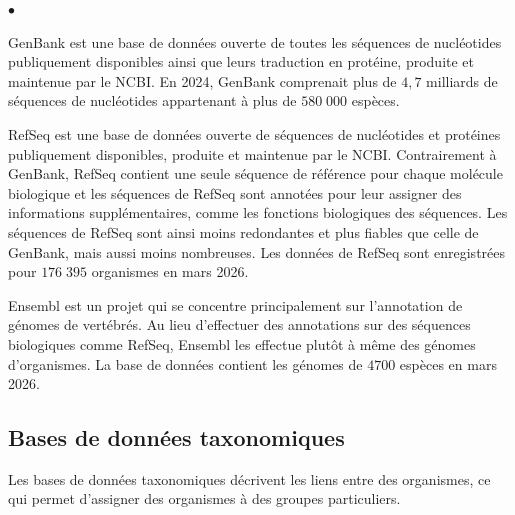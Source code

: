 \begin{list}{$\bullet$}{}
    \item GenBank \cite{genbank} est une base de données ouverte de toutes les séquences de
        nucléotides publiquement disponibles ainsi que leurs traduction en protéine, produite et
        maintenue par le NCBI. En 2024, GenBank comprenait plus de $4,7$ milliards de séquences de
        nucléotides appartenant à plus de $580\;000$ espèces.
    \item RefSeq \cite{refseq} est une base de données ouverte de séquences de nucléotides et
        protéines publiquement disponibles, produite et maintenue par le NCBI. Contrairement à
        GenBank, RefSeq contient une seule séquence de référence pour chaque molécule biologique et
        les séquences de RefSeq sont annotées pour leur assigner des informations supplémentaires,
        comme les fonctions biologiques des séquences. Les séquences de RefSeq sont ainsi moins
        redondantes et plus fiables que celle de GenBank, mais aussi moins nombreuses. Les données
        de RefSeq sont enregistrées pour $176\;395$ organismes en mars 2026.
    \item Ensembl \cite{ensembl} est un projet qui se concentre principalement sur l'annotation de
        génomes de vertébrés. Au lieu d'effectuer des annotations sur des séquences biologiques
        comme RefSeq, Ensembl les effectue plutôt à même des génomes d'organismes. La base de
        données contient les génomes de $4700$ espèces en mars 2026.
\end{list}

\subsection{Bases de données taxonomiques}
Les bases de données taxonomiques décrivent les liens entre des organismes, ce qui permet d'assigner
des organismes à des groupes particuliers.

